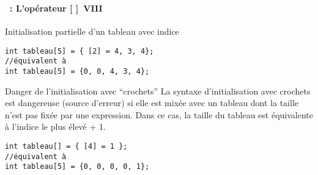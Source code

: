 \begin{frame}[containsverbatim]
  \frametitle{\secname}
  \framesubtitle{\subsecname~: L'opérateur [ ]~VIII}

  \begin{exampleblock}{Initialisation partielle d'un tableau avec indice}
    \begin{verbatim}
int tableau[5] = { [2] = 4, 3, 4};
//équivalent à 
int tableau[5] = {0, 0, 4, 3, 4};\end{verbatim}
  \end{exampleblock}
  \begin{alertblock}{Danger de l'initialisation avec ``crochets''}
    La syntaxe d'initialisation avec crochets est dangereuse (source d'erreur) si elle est mixée avec un tableau dont la taille n'est pas
    fixée par une expression. Dans ce cas, la taille du tableau est équivalente à l'indice le plus élevé + 1.
    \begin{verbatim}int tableau[] = { [4] = 1 };
//équivalent à 
int tableau[5] = {0, 0, 0, 0, 1};\end{verbatim}
  \end{alertblock}
\end{frame}

